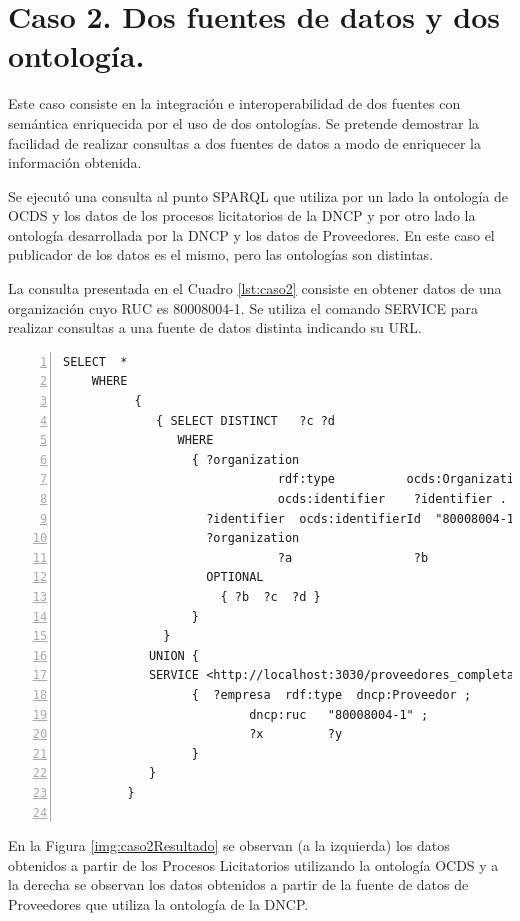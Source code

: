 \section{Caso 2. Dos fuentes de datos y dos ontología.}


Este caso consiste en la integración e interoperabilidad de dos fuentes con semántica enriquecida por el uso de dos ontologías. Se pretende demostrar la facilidad de realizar consultas a dos fuentes de datos a modo de enriquecer la información obtenida.

Se ejecutó una consulta al punto SPARQL que utiliza por un lado la ontología de OCDS y los datos de los procesos licitatorios de la DNCP y por otro lado la ontología desarrollada por la DNCP y los datos de Proveedores. En este caso el publicador de los datos es el mismo, pero las ontologías son distintas.

La consulta presentada en el Cuadro \ref{lst:caso2} consiste en obtener datos de una organización cuyo RUC es 80008004-1. Se utiliza el comando SERVICE para realizar consultas a una fuente de datos distinta indicando su URL.

\noindent\begin{minipage}[c]{\textwidth}
\begin{lstlisting}[captionpos=b, caption={Consulta a dos fuentes de de datos}, label={lst:caso2},  numbers=left,  numberstyle=\tiny\color{mygray},
    basicstyle=\footnotesize\ttfamily,frame=single]
SELECT  *
    WHERE
          {   
             { SELECT DISTINCT   ?c ?d
                WHERE
                  { ?organization
                              rdf:type          ocds:Organization ;
                              ocds:identifier    ?identifier .
                    ?identifier  ocds:identifierId  "80008004-1" .
                    ?organization
                              ?a                 ?b
                    OPTIONAL
                      { ?b  ?c  ?d }
                  }
              }
            UNION {
            SERVICE <http://localhost:3030/proveedores_completas_no_inf/sparql>
                  {  ?empresa  rdf:type  dncp:Proveedor ;
                          dncp:ruc   "80008004-1" ;
                          ?x         ?y
                  }
            }
         }
    
 \end{lstlisting}
\end{minipage}

 En la Figura \ref{img:caso2Resultado} se observan (a la izquierda) los datos obtenidos a partir de los Procesos Licitatorios utilizando la ontología OCDS y a la derecha se observan los datos obtenidos a partir de la fuente de datos de Proveedores que utiliza la ontología de la DNCP.


